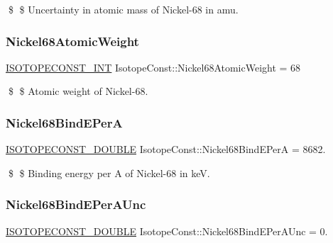 \$ \$ Uncertainty in atomic mass of Nickel-\/68 in amu. \mbox{\label{group___isotope_const-_nickel-_ni68_ga66a5f1e30ce13567cd827cfdc671b058}} 
\subsubsection{\texorpdfstring{Nickel68\+Atomic\+Weight}{Nickel68AtomicWeight}}
{\footnotesize\ttfamily \mbox{\hyperlink{group___isotope_const-_macros_ga5f18360b3e99483a35c32d789e62621c}{I\+S\+O\+T\+O\+P\+E\+C\+O\+N\+S\+T\+\_\+\+I\+NT}} Isotope\+Const\+::\+Nickel68\+Atomic\+Weight = 68}

\$ \$ Atomic weight of Nickel-\/68. \mbox{\label{group___isotope_const-_nickel-_ni68_gac19dc9a605f13f9102715a52fb63e604}} 
\subsubsection{\texorpdfstring{Nickel68\+Bind\+E\+PerA}{Nickel68BindEPerA}}
{\footnotesize\ttfamily \mbox{\hyperlink{group___isotope_const-_macros_ga8f45a7272ce02c0b4c65c44636ed719a}{I\+S\+O\+T\+O\+P\+E\+C\+O\+N\+S\+T\+\_\+\+D\+O\+U\+B\+LE}} Isotope\+Const\+::\+Nickel68\+Bind\+E\+PerA = 8682.}

\$ \$ Binding energy per A of Nickel-\/68 in keV. \mbox{\label{group___isotope_const-_nickel-_ni68_gae7055a750c624b4a046e646989e04828}} 
\subsubsection{\texorpdfstring{Nickel68\+Bind\+E\+Per\+A\+Unc}{Nickel68BindEPerAUnc}}
{\footnotesize\ttfamily \mbox{\hyperlink{group___isotope_const-_macros_ga8f45a7272ce02c0b4c65c44636ed719a}{I\+S\+O\+T\+O\+P\+E\+C\+O\+N\+S\+T\+\_\+\+D\+O\+U\+B\+LE}} Isotope\+Const\+::\+Nickel68\+Bind\+E\+Per\+A\+Unc = 0.}

